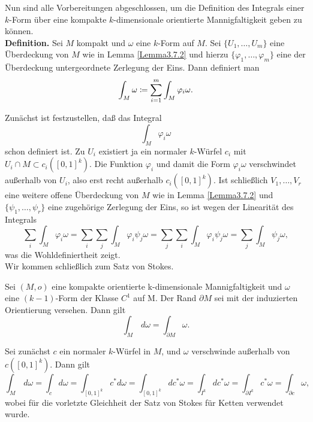 \documentclass[a4paper,twoside,DIV15,BCOR12mm]{scrbook}
\begin{document}
\noindent
Nun sind alle Vorbereitungen abgeschlossen, um die Definition des Integrals einer $k$-Form 
über eine kompakte $k$-dimensionale orientierte Mannigfaltigkeit geben zu können.\\

\noindent
{\bf  Definition.} Sei $M$ kompakt und $\omega$ eine $k$-Form auf $M$. Sei $\{U_1,\ldots,U_m\}$ 
eine Überdeckung von $M$ wie in Lemma \ref{Lemma3.7.2} und hierzu $\{\varphi_1,\ldots,\varphi_m\}$ 
eine der Überdeckung untergeordnete Zerlegung der Eins. Dann definiert man
\[ \int_{M} \omega \da  \sum_{i=1}^{m} \int_{M} \varphi_{i}\omega. \]

\bigskip

 Zunächst ist festzustellen, daß das Integral
\[ \int_{M} \varphi_{i}\omega \]
schon definiert ist. Zu $U_{i}$ existiert ja ein normaler $k$-Würfel $c_{i}$ mit 
$U_{i} \cap M \subset c_{i}([0,1]^{k})$. Die Funktion $\varphi_{i}$ und 
damit die Form $\varphi_{i}\omega$ verschwindet außerhalb von $U_{i}$, 
also erst recht außerhalb $c_{i}([0,1]^{k})$. Ist schließlich 
$V_{1},\dots,V_{r}$ eine weitere offene Überdeckung von $M$ wie in Lemma \ref{Lemma3.7.2} und $\{\psi_{1},\dots,\psi_{r}\}$ eine zugehörige Zerlegung der Eins, so ist wegen der Linearität 
des Integrals
\[
\sum_{i} \int_{M} \varphi_{i} \omega  =  \sum_{i} \sum_{j} \int_{M} \varphi_{i} 
\psi_{j} \omega = \sum_{j} \sum_{i} \int_{M} \varphi_{i} \psi_{j}\omega  =  
\sum_{j} \int_{M} \psi_{j}\omega,
\]
was die Wohldefiniertheit zeigt.\\

\noindent
Wir kommen schließlich zum Satz von Stokes.

\bigskip

\begin{satz}\label{Satz3.7.3} {Sei $(M,o)$ eine kompakte orientierte 
k-dimensionale Mannigfaltigkeit und $\omega$ eine $(k-1)$-Form der Klasse $C^1$ auf M. 
Der Rand $\partial M$ sei mit der induzierten Orientierung versehen. 
Dann gilt}
\[ \int_{M} \, d\omega = \int_{\partial M} \omega. \]
\end{satz}

\bigskip

 Sei zunächst $c$ ein normaler $k$-Würfel in $M$, und 
$\omega$ verschwinde außerhalb von $c([0,1]^{k})$. Dann gilt
\[
\int_{M} \, d\omega  =  \int_{c}  d\omega = \int_{[0,1]^{k}} c^{*}  d\omega 
= \int_{[0,1]^{k}} dc^{*} \omega 
 =  \int_{I^{k}}  dc^{*} \omega = \int_{\partial I^{k}} c^{*} \omega 
= \int_{\partial c} \omega, 
\]
wobei für die vorletzte Gleichheit der Satz von Stokes für Ketten verwendet wurde.
\end{document}
